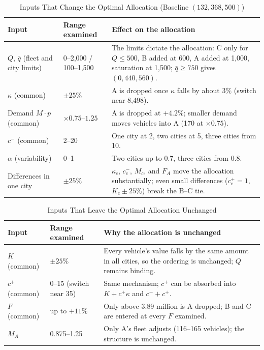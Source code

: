 \documentclass[10pt,a4paper]{article}
\begin{document}
\begin{table}[H]
\centering\small
\caption{Inputs That Change the Optimal Allocation (Baseline $(132,368,500)$)}\label{tab:an-sens-decision}
\begin{tabular}{P{.24\linewidth}P{.17\linewidth}P{.52\linewidth}}
\toprule
Input & Range examined & Effect on the allocation\\\midrule
$Q$, $\bar q$ (fleet and city limits) & 0--2{,}000 / 100--1{,}500 & The limits dictate the allocation: C only for $Q\le500$, B added at 600, A added at 1{,}000, saturation at 1{,}500; $\bar q\ge750$ gives $(0,440,560)$.\\
$\kappa$ (common) & $\pm25\%$ & A is dropped once $\kappa$ falls by about 3\% (switch near 8{,}498).\\
Demand $M\cdot p$ (common) & $\times0.75$--$1.25$ & A is dropped at $+4.2\%$; smaller demand moves vehicles into A (170 at $\times0.75$).\\
$c^-$ (common) & 2--20 & One city at 2, two cities at 5, three cities from 10.\\
$\alpha$ (variability) & 0--1 & Two cities up to 0.7, three cities from 0.8.\\
Differences in one city & $\pm25\%$ & $\kappa_c$, $c_c^-$, $M_c$, and $F_A$ move the allocation substantially; even small differences ($c_c^+=1$, $K_c\pm25\%$) break the B--C tie.\\
\bottomrule
\end{tabular}
\end{table}

\begin{table}[H]
\centering\small
\caption{Inputs That Leave the Optimal Allocation Unchanged}\label{tab:an-sens-insensitive}
\begin{tabular}{P{.24\linewidth}P{.22\linewidth}P{.47\linewidth}}
\toprule
Input & Range examined & Why the allocation is unchanged\\\midrule
$K$ (common) & $\pm25\%$ & Every vehicle's value falls by the same amount in all cities, so the ordering is unchanged; $Q$ remains binding.\\
$c^+$ (common) & 0--15 (switch near 35) & Same mechanism; $c^+$ can be absorbed into $K+c^+\kappa$ and $c^-+c^+$.\\
$F$ (common) & up to $+11\%$ & Only above 3.89 million is A dropped; B and C are entered at every $F$ examined.\\
$M_A$ & 0.875--1.25 & Only A's fleet adjusts (116--165 vehicles); the structure is unchanged.\\
\bottomrule
\end{tabular}
\end{table}
\end{document}
